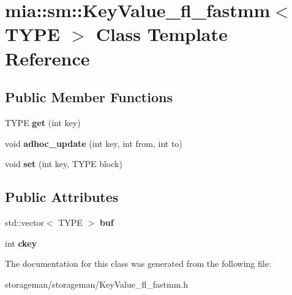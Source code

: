 \hypertarget{classmia_1_1sm_1_1_key_value__fl__fastmm}{\section{mia\-:\-:sm\-:\-:Key\-Value\-\_\-fl\-\_\-fastmm$<$ T\-Y\-P\-E $>$ Class Template Reference}
\label{classmia_1_1sm_1_1_key_value__fl__fastmm}
}
\subsection*{Public Member Functions}
\begin{DoxyCompactItemize}
\item 
\hypertarget{classmia_1_1sm_1_1_key_value__fl__fastmm_a24333a0561f8b964336ff2daccbb67c4}{T\-Y\-P\-E {\bfseries get} (int key)}\label{classmia_1_1sm_1_1_key_value__fl__fastmm_a24333a0561f8b964336ff2daccbb67c4}

\item 
\hypertarget{classmia_1_1sm_1_1_key_value__fl__fastmm_adaf38e7af4df690ab2dc2999e704e7ca}{void {\bfseries adhoc\-\_\-update} (int key, int from, int to)}\label{classmia_1_1sm_1_1_key_value__fl__fastmm_adaf38e7af4df690ab2dc2999e704e7ca}

\item 
\hypertarget{classmia_1_1sm_1_1_key_value__fl__fastmm_a4d8bfa1802f8b9b0816fe3d3bc66ec02}{void {\bfseries set} (int key, T\-Y\-P\-E block)}\label{classmia_1_1sm_1_1_key_value__fl__fastmm_a4d8bfa1802f8b9b0816fe3d3bc66ec02}

\end{DoxyCompactItemize}
\subsection*{Public Attributes}
\begin{DoxyCompactItemize}
\item 
\hypertarget{classmia_1_1sm_1_1_key_value__fl__fastmm_a61d7f11502996d4f228e7613e20366c1}{std\-::vector$<$ T\-Y\-P\-E $>$ {\bfseries buf}}\label{classmia_1_1sm_1_1_key_value__fl__fastmm_a61d7f11502996d4f228e7613e20366c1}

\item 
\hypertarget{classmia_1_1sm_1_1_key_value__fl__fastmm_a72b41a58160ec4814b409c7b0d0936e6}{int {\bfseries ckey}}\label{classmia_1_1sm_1_1_key_value__fl__fastmm_a72b41a58160ec4814b409c7b0d0936e6}

\end{DoxyCompactItemize}


The documentation for this class was generated from the following file\-:\begin{DoxyCompactItemize}
\item 
storageman/storageman/Key\-Value\-\_\-fl\-\_\-fastmm.\-h\end{DoxyCompactItemize}
